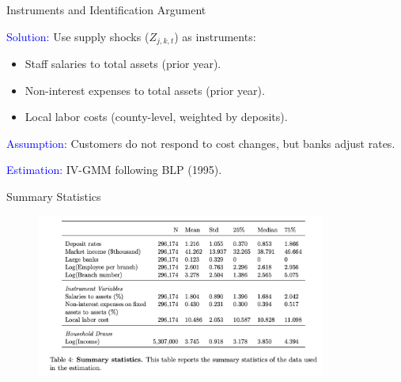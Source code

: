 \documentclass[notes,10pt, aspectratio=169]{beamer}
\newenvironment{wideitemize}{\itemize\addtolength{\itemsep}{10pt}}{\enditemize}
\begin{document}
\begin{frame}{Instruments and Identification Argument}
    \begin{wideitemize}
        \item \textcolor{blue}{Solution:} Use supply shocks (\(Z_{j,k,t}\)) as instruments:  
        \begin{itemize}
            \item Staff salaries to total assets (prior year).  
            \item Non-interest expenses to total assets (prior year).  
            \item Local labor costs (county-level, weighted by deposits).  
        \end{itemize}
        \item \textcolor{blue}{Assumption:} Customers do not respond to cost changes, but banks adjust rates.  
        \item \textcolor{blue}{Estimation:} IV-GMM following BLP (1995).  
    \end{wideitemize}
\end{frame}


\begin{frame}{Summary Statistics}

    \begin{figure}
    \centering
    \begin{minipage}{0.9\textwidth}
        \end{minipage}
    \includegraphics[width=0.85\textwidth]{imgs/tab4.png}
    \end{figure}
\end{frame}
\end{document}
